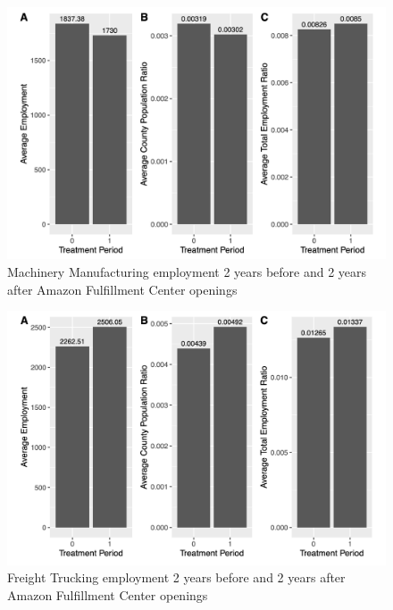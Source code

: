 \documentclass[11pt]{article}
\begin{document}
\begin{figure}[H]
\centering
\includegraphics[width=15cm]{MACHMF.png}
\caption{Machinery Manufacturing employment 2 years before and 2 years after Amazon Fulfillment Center openings}
\end{figure}

\begin{figure}[H]
\centering
\includegraphics[width=15cm]{FRTRUCK.png}
\caption{Freight Trucking employment 2 years before and 2 years after Amazon Fulfillment Center openings}
\end{figure}
\end{document}
